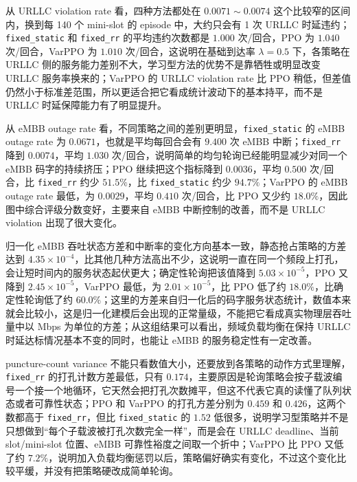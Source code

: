 从 URLLC violation rate 看，四种方法都处在 \(0.0071\sim0.0074\) 这个比较窄的区间内，换到每 140 个 mini-slot 的 episode 中，大约只会有 1 次 URLLC 时延违约；\texttt{fixed\_static} 和 \texttt{fixed\_rr} 的平均违约次数都是 \(1.000\) 次/回合，PPO 为 \(1.040\) 次/回合，VarPPO 为 \(1.010\) 次/回合，这说明在基础到达率 \(\lambda=0.5\) 下，各策略在 URLLC 侧的服务能力差别不大，学习型方法的优势不是靠牺牲或明显改变 URLLC 服务率换来的；VarPPO 的 URLLC violation rate 比 PPO 稍低，但差值仍然小于标准差范围，所以更适合把它看成统计波动下的基本持平，而不是 URLLC 时延保障能力有了明显提升。

从 eMBB outage rate 看，不同策略之间的差别更明显，\texttt{fixed\_static} 的 eMBB outage rate 为 \(0.0671\)，也就是平均每回合会有 \(9.400\) 次 eMBB 中断；\texttt{fixed\_rr} 降到 \(0.0074\)，平均 \(1.030\) 次/回合，说明简单的均匀轮询已经能明显减少对同一个 eMBB 码字的持续挤压；PPO 继续把这个指标降到 \(0.0036\)，平均 \(0.500\) 次/回合，比 \texttt{fixed\_rr} 约少 \(51.5\%\)，比 \texttt{fixed\_static} 约少 \(94.7\%\)；VarPPO 的 eMBB outage rate 最低，为 \(0.0029\)，平均 \(0.410\) 次/回合，比 PPO 又少约 \(18.0\%\)，因此图中综合评级分数变好，主要来自 eMBB 中断控制的改善，而不是 URLLC violation 出现了很大变化。

归一化 eMBB 吞吐状态方差和中断率的变化方向基本一致，静态抢占策略的方差达到 \(4.35\times10^{-4}\)，比其他几种方法高出不少，这说明一直在同一个频段上打孔，会让短时间内的服务状态起伏更大；确定性轮询把该值降到 \(5.03\times10^{-5}\)，PPO 又降到 \(2.45\times10^{-5}\)，VarPPO 最低，为 \(2.01\times10^{-5}\)，比 PPO 低了约 \(18.0\%\)，比确定性轮询低了约 \(60.0\%\)；这里的方差来自归一化后的码字服务状态统计，数值本来就会比较小，这是归一化建模后会出现的正常量级，不能把它看成真实物理层吞吐量中以 Mbps 为单位的方差；从这组结果可以看出，频域负载均衡在保持 URLLC 时延达标情况基本不变的同时，也能让 eMBB 的服务稳定性有一定改善。

puncture-count variance 不能只看数值大小，还要放到各策略的动作方式里理解，\texttt{fixed\_rr} 的打孔计数方差最低，只有 \(0.174\)，主要原因是轮询策略会按子载波编号一个接一个地循环，它天然会把打孔次数摊平，但这不代表它真的读懂了队列状态或者可靠性状态；PPO 和 VarPPO 的打孔方差分别为 \(0.459\) 和 \(0.426\)，这两个数都高于 \texttt{fixed\_rr}，但比 \texttt{fixed\_static} 的 \(1.52\) 低很多，说明学习型策略并不是只想做到“每个子载波被打孔次数完全一样”，而是会在 URLLC deadline、当前 slot/mini-slot 位置、eMBB 可靠性裕度之间取一个折中；VarPPO 比 PPO 又低了约 \(7.2\%\)，说明加入负载均衡惩罚以后，策略偏好确实有变化，不过这个变化比较平缓，并没有把策略硬改成简单轮询。

